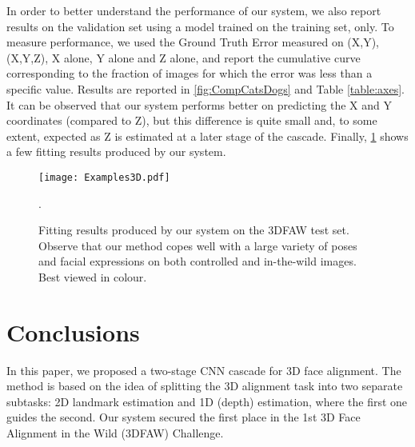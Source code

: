 \documentclass[runningheads]{llncs}
\begin{document}
In order to better understand the performance of our system, we also report results on the validation set using a model trained on the training set, only. To measure performance, we used the Ground Truth Error measured on (X,Y), (X,Y,Z), X alone, Y alone and Z alone, and report the cumulative curve corresponding to the fraction of images for which the error was less than a specific value. Results are reported in \figurename{\ref{fig:CompCatsDogs}} and Table \ref{table:axes}. It can be observed that our system performs  better on predicting the X and Y coordinates (compared to Z), but this difference is quite small and, to some extent, expected as Z is estimated at a later stage of the cascade. Finally, \figurename{\ref{fig:3DExamples}} shows a few fitting results produced by our system.

\begin{figure*}[h]
	\centering
	\vspace{0.5em}
	\caption{GTE vs fraction of test images on the 3DFAW validation set, on (X,Y), (X,Y,Z), X alone, Y alone and Z alone.}
	\label{fig:CompCatsDogs}
\end{figure*}


\begin{figure}
	\centering 
	\texttt{[image: Examples3D.pdf]}
	\caption{Fitting results produced by our system on the 3DFAW test set. Observe that our method copes well with a large variety of poses and facial expressions on both controlled and in-the-wild images. Best viewed in colour.}.
	\label{fig:3DExamples}
\end{figure} 

\section{Conclusions}\label{sec:conclusions}
In this paper, we proposed a two-stage CNN cascade for 3D face alignment. The method is based on the idea of splitting the 3D alignment task into two separate subtasks: 2D landmark estimation and 1D (depth) estimation, where the first one guides the second. Our system secured the first place in the 1st 3D Face Alignment in the Wild (3DFAW) Challenge.
\end{document}
